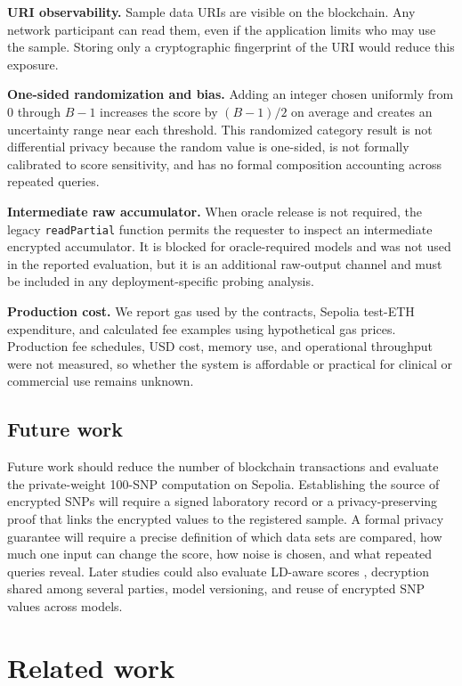 \documentclass[10pt]{article}
\begin{document}
\textbf{URI observability.}
Sample data URIs are visible on the blockchain.  Any network participant can read them,
even if the application limits who may use the sample.  Storing only a cryptographic
fingerprint of the URI would reduce this exposure.

\textbf{One-sided randomization and bias.}
Adding an integer chosen uniformly from $0$ through $B-1$ increases the score by
$(B-1)/2$ on average and creates an uncertainty range near each threshold.  This
randomized category result is not
differential privacy because the random value is one-sided, is not formally calibrated
to score sensitivity, and has no formal composition accounting across repeated queries.

\textbf{Intermediate raw accumulator.}
When oracle release is not required, the legacy \texttt{readPartial} function permits the
requester to inspect an intermediate encrypted accumulator.  It is blocked for
oracle-required models and was not used in the reported evaluation, but it is an additional
raw-output channel and must be included in any deployment-specific probing analysis.

\textbf{Production cost.}
We report gas used by the contracts, Sepolia test-ETH expenditure, and calculated fee
examples using hypothetical gas prices.  Production fee schedules, USD cost, memory
use, and operational throughput were not measured, so whether the system is affordable
or practical for clinical or commercial use remains unknown.

\subsection{Future work}

Future work should reduce the number of blockchain transactions and evaluate the
private-weight 100-SNP computation on Sepolia.  Establishing the source of encrypted
SNPs will require a signed laboratory record or a privacy-preserving proof that links
the encrypted values to the registered sample.  A formal privacy guarantee will require
a precise definition of which data sets are compared, how much one input can change the
score, how noise is chosen, and what repeated queries reveal.  Later studies could also
evaluate LD-aware scores \citep{prive2020ldpred2}, decryption shared among several parties, model versioning,
and reuse of encrypted SNP values across models.

\section{Related work}
\label{sec:related}
\end{document}
